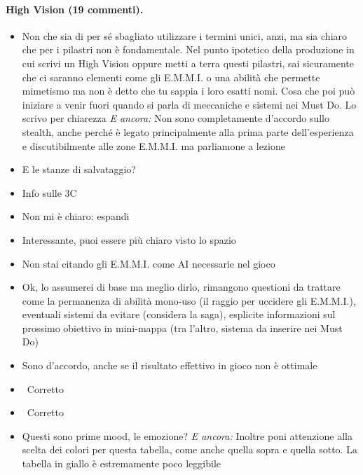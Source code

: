 \paragraph{High Vision (19 commenti).}
{\small
\begin{itemize}
  \item {} Non che sia di per sé sbagliato utilizzare i termini unici, anzi, ma sia chiaro che per i pilastri non è fondamentale. Nel punto ipotetico della produzione in cui scrivi un High Vision oppure metti a terra questi pilastri, sai sicuramente che ci saranno elementi come gli E.M.M.I. o una abilità che permette mimetismo ma non è detto che tu sappia i loro esatti nomi. Cosa che poi può iniziare a venir fuori quando si parla di meccaniche e sistemi nei Must Do. Lo scrivo per chiarezza \emph{E ancora:} Non sono completamente d'accordo sullo stealth, anche perché è legato principalmente alla prima parte dell'esperienza e discutibilmente alle zone E.M.M.I. ma parliamone a lezione
  \item {} E le stanze di salvataggio?
  \item {} Info sulle 3C
  \item {} Non mi è chiaro: espandi
  \item {} Interessante, puoi essere più chiaro visto lo spazio
  \item {} Non stai citando gli E.M.M.I. come AI necessarie nel gioco
  \item {} Ok, lo assumerei di base ma meglio dirlo, rimangono questioni da trattare come la permanenza di abilità mono-uso (il raggio per uccidere gli E.M.M.I.), eventuali sistemi da evitare (considera la saga), esplicite informazioni sul prossimo obiettivo in mini-mappa (tra l'altro, sistema da inserire nei Must Do)
  \item {} Sono d'accordo, anche se il risultato effettivo in gioco non è ottimale
  \item {} \rvBene\ Corretto
  \item {} \rvBene\ Corretto
  \item {} Questi sono prime mood, le emozione? \emph{E ancora:} Inoltre poni attenzione alla scelta dei colori per questa tabella, come anche quella sopra e quella sotto. La tabella in giallo è estremamente poco leggibile

\end{itemize}}
